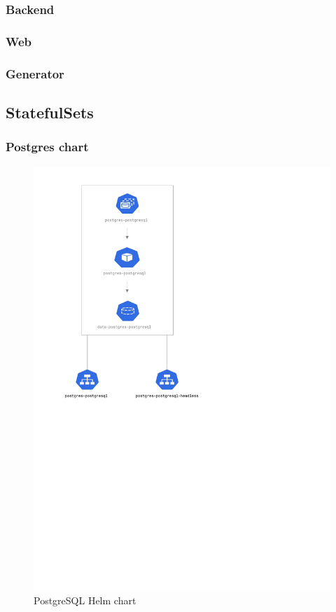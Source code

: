 \documentclass[thesis=B,english]{FITthesis}[2019/12/23]
\begin{document}
\subsubsection{Backend}

\subsubsection{Web}

\subsubsection{Generator}

\subsection{StatefulSets}

\subsubsection{Postgres chart}
\begin{figure}[H]
\centering
\caption{PostgreSQL Helm chart}
\hspace*{1cm}
\includegraphics[scale=0.5]{postgres-diagram}
\end{figure}
\end{document}
